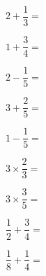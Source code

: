 \exo{}

\medskip

\begin{multicols}{3}
\begin{spacing}{3}

$2+\dfrac{1}{3}=$

$1+\dfrac{3}{4}=$

$2-\dfrac{1}{5}=$

$3+\dfrac{2}{5}=$

$1-\dfrac{1}{5}=$

$3\times\dfrac{2}{3}=$

$3\times\dfrac{3}{5}=$


$\dfrac{1}{2}+\dfrac{3}{4}=$

$\dfrac{1}{8}+\dfrac{1}{4}=$

\end{spacing}	
\end{multicols}